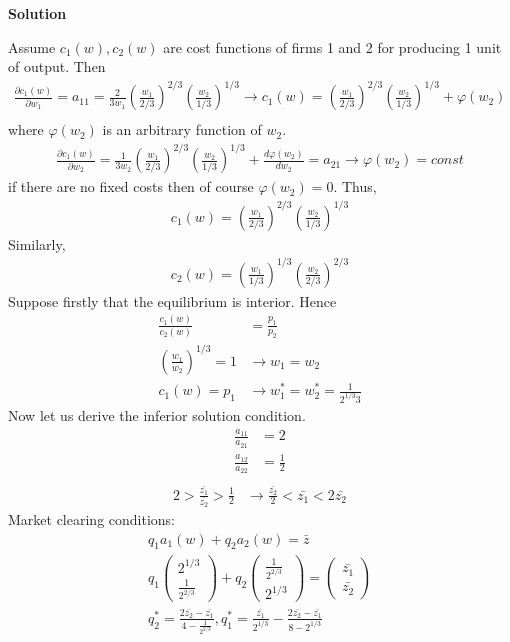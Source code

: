 \documentclass[a4paper]{article}
\begin{document}
\textbf{Solution}

Assume $c_1(w), c_2(w)$ are cost functions of firms 1 and 2 for producing 1 unit of output. Then
\begin{align*}
\frac{\partial c_1(w)}{\partial w_1} = a_{11} = \frac{2}{3w_1}\left(\frac{w_1}{2/3}\right)^{2/3}\left(\frac{w_2}{1/3}\right)^{1/3} \to c_1(w) =\left(\frac{w_1}{2/3}\right)^{2/3}\left(\frac{w_2}{1/3}\right)^{1/3} + \varphi(w_2)\\
\end{align*}
where $\varphi(w_2)$ is an arbitrary function of $w_2$.
\begin{align*}
\frac{\partial c_1(w)}{\partial w_2} = \frac{1}{3w_2}\left(\frac{w_1}{2/3}\right)^{2/3}\left(\frac{w_2}{1/3}\right)^{1/3} + \frac{d\varphi(w_2)}{dw_2} = a_{21} \to \varphi(w_2) = const
\end{align*}
if there are no fixed costs then of course $\varphi(w_2) = 0$. Thus, 
\begin{align*}
c_1(w) = \left(\frac{w_1}{2/3}\right)^{2/3}\left(\frac{w_2}{1/3}\right)^{1/3}
\end{align*}
Similarly, 
\begin{align*}
c_2(w) = \left(\frac{w_1}{1/3}\right)^{1/3}\left(\frac{w_2}{2/3}\right)^{2/3}
\end{align*}
Suppose firstly that the equilibrium is interior. Hence
\begin{align*}
\frac{c_1(w)}{c_2(w)} &= \frac{p_1}{p_2}\\
\left(\frac{w_1}{w_2}\right)^{1/3} = 1 &\to w_1 = w_2\\
c_1(w) = p_1 &\to w_1^* = w_2^* = \frac{1}{2^{1/3}3}
\end{align*}
Now let us derive the inferior solution condition.
\begin{align*}
\frac{a_{11}}{a_{21}} &= 2\\
\frac{a_{12}}{a_{22}} &= \frac{1}{2}\\
\end{align*}
\begin{align}\label{eq1}
2 > \frac{\bar{z_1}}{\bar{z_2}} > \frac{1}{2} &\to \frac{\bar{z_2}}{2} < \bar{z_1} < 2\bar{z_2}
\end{align}
Market clearing conditions:
\begin{align*}
q_1 a_1(w) + q_2 a_2(w) = \bar{z}\\
q_1 \begin{pmatrix}
2^{1/3}\\
\frac{1}{2^{2/3}}
\end{pmatrix} + q_2 \begin{pmatrix}
\frac{1}{2^{2/3}}\\
2^{1/3}
\end{pmatrix} = \begin{pmatrix}
\bar{z_1}\\
\bar{z_2}
\end{pmatrix}\\
q_2^* = \frac{2\bar{z_2} - \bar{z_1}}{4 - \frac{1}{2^{2/3}}}, q_1^* = \frac{\bar{z_1}}{2^{1/3}} - \frac{2\bar{z_2} - \bar{z_1}}{8 - 2^{1/3}}
\end{align*}
\end{document}
